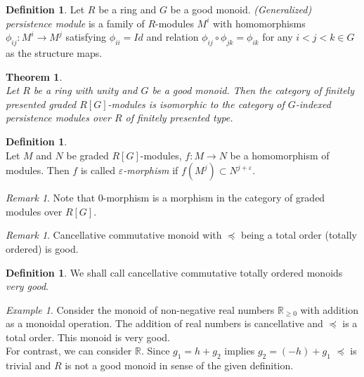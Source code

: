 \documentclass[english,12pt]{article}
\newcounter{stmcounter}[section]
\newcounter{thcounter}
\numberwithin{equation}{section}
\newtheorem{theorem}[thcounter]{Theorem}
\theoremstyle{definition}
\newtheorem{definition}[stmcounter]{Definition}
\theoremstyle{remark}
\newtheorem{remark}[stmcounter]{Remark}
\newtheorem{example}[stmcounter]{Example}
\newcommand{\define}[1]{{\textit{#1}}}
\renewcommand{\geq}{\geqslant}
\begin{document}
\begin{definition} {\cite[Definition 12]{Corbet18}}
  Let $R$ be a ring and $G$ be a good monoid. \define{(Generalized) persistence module} is a family of $R$-modules $M^i$ with homomorphisms $\phi_{ij} : M^i \to M^{j}$ satisfying $\phi_{ii} = Id$ and relation $\phi_{ij} \circ \phi_{jk} = \phi_{ik}$ for any $i < j < k \in G$ as the structure maps.
\end{definition}

\begin{theorem} {\cite[Theorem 21]{Corbet18}}\\
  Let $R$ be a ring with unity and $G$ be a good monoid. Then the category of finitely presented graded $R[G]$-modules is isomorphic to the category of $G$-indexed persistence modules over $R$ of finitely presented type.
\end{theorem}

\begin{definition} {\cite[Definition 2.7]{GS16}}\\
  Let $M$ and $N$ be graded $R[G]$-modules, $f : M \to N$ be a homomorphism of modules. Then $f$ is called \define{$\varepsilon$-morphism} if $f(M^j) \subset N^{j+\varepsilon}$.
\end{definition}

\begin{remark}
  Note that $0$-morphism is a morphism in the category of graded modules over $R[G]$.
\end{remark}

\begin{remark}
  Cancellative commutative monoid with $\preceq$ being a total order (totally ordered) is good.
\end{remark}

\begin{definition}
  We shall call cancellative commutative totally ordered monoids \define{very good}.
\end{definition}

\begin{example}
  Consider the monoid of non-negative real numbers $\mathbb{R}_{\geq 0}$ with addition as a monoidal operation. The addition of real numbers is cancellative and $\preceq$ is a total order. This monoid is very good.\\

  For contrast, we can consider $\mathbb{R}$. Since $g_1 = h + g_2$ implies $g_2 = (-h) + g_1$ $\preceq$ is trivial and $R$ is not a good monoid in sense of the given definition.
\end{example} ~ \par
\end{document}
